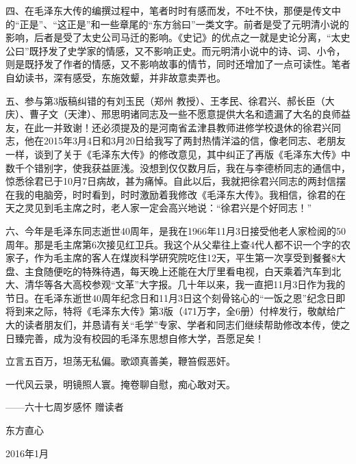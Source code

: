 \documentclass[../../dazhuan.tex]{subfiles}
\begin{document}
四、在毛泽东大传的编撰过程中，笔者时时有感而发，不吐不快，那便是传文中的“正是”、“这正是”和一些章尾的“东方翁曰”一类文字。前者是受了元明清小说的影响，后者是受了太史公司马迁的影响。《史记》的优点之一就是史论分离，“太史公曰”既抒发了史学家的情感，又不影响正史。而元明清小说中的诗、词、小令，则是既抒发了作者的情感，又不影响故事的情节，同时还增加了一点可读性。笔者自幼读书，深有感受，东施效颦，并非故意卖弄也。

五、参与第3版稿纠错的有刘玉民（郑州 教授）、王孝民、徐君兴、郝长臣（大庆）、曹子文（天津）、邢思明诸同志及一些不愿意提供大名和遗漏了大名的良师益友，在此一并致谢！还必须提及的是河南省孟津县教师进修学校退休的徐君兴同志，他在2015年3月4日和3月20日给我写了两封热情洋溢的信，像老同志、老朋友一样，谈到了关于《毛泽东大传》的修改意见，其中纠正了再版《毛泽东大传》中数千个错别字，使我获益匪浅。没想到仅仅数月后，我在与李德桥同志的通信中，惊悉徐君已于10月7日病故，甚为痛悼。自此以后，我就把徐君兴同志的两封信摆在我的电脑旁，时时看到，时时激励着我修改《毛泽东大传》。我相信，徐君的在天之灵见到毛主席之时，老人家一定会高兴地说：“徐君兴是个好同志！”

六、今年是毛泽东同志逝世40周年，是我在1966年11月3日接受他老人家检阅的50周年。那是毛主席第6次接见红卫兵。我这个从父辈往上查4代人都不识一个字的农家子，作为毛主席的客人在煤炭科学研究院吃住12天，平生第一次享受到餐餐8大盘、主食随便吃的特殊待遇，每天晚上还能在大厅里看电视，白天乘着汽车到北大、清华等各大高校参观“文革”大字报。几十年以来，我一直把11月3日作为我的节日。在毛泽东逝世40周年纪念日和11月3日这个刻骨铭心的“一饭之恩”纪念日即将到来之际，特将《毛泽东大传》第3版（471万字，全6册）付梓发行，敬献给广大的读者朋友们，并恳请有关“毛学”专家、学者和同志们继续帮助修改本传，使之日臻完善，成为没有校园的毛泽东思想自修大学，吾愿足矣！

\kaishu
立言五百万，坦荡无私偏。歌颂真善美，鞭笞假恶奸。

一代风云录，明镜照人寰。掩卷聊自慰，痴心敢对天。

\hfil ——六十七周岁感怀 赠读者
\normalfont

\hspace{18em} 东方直心

\hspace{18em} 2016年1月
    
\end{document}
